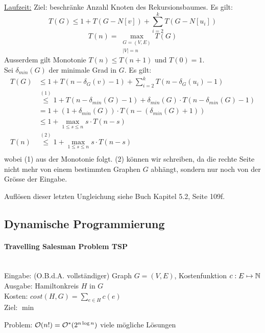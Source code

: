 \underline{Laufzeit:}
Ziel: beschränke Anzahl Knoten des Rekursionsbaumes. Es gilt:
$$ T(G) \leq 1 + T(G-N[v]) + \sum_{i=2}^k T(G-N[u_i]) $$
$$ T(n) = \max_{\substack{ G=(V,E) \\ |V|=n}} T(G) $$
%
Ausserdem gilt Monotonie $T(n) \leq T(n+1)$ und $T(0) = 1$. \\
Sei $\delta_{min}(G)$ der minimale Grad in $G$. Es gilt:
%
\begin{align*}
T(G) & \leq 1 + T(n - \delta_G(v) - 1) + \sum_{i=2}^k T(n - \delta_G(u_i) - 1) \\
     & \overset{(1)}{\leq} 1 + T(n - \delta_{min}(G) - 1) + \delta_{min}(G) \cdot T(n - \delta_{min}(G) - 1) \\
     & = 1 + (1 + \delta_{min}(G)) \cdot T(n - (\delta_{min}(G) + 1)) \\
     & \leq 1 + \max_{1 \leq s \leq n} s \cdot T(n - s) \\
T(n) & \overset{(2)}{\leq} 1 + \max_{1 \leq s \leq n} s \cdot T(n - s) \\
\end{align*}
wobei (1) aus der Monotonie folgt.
(2) können wir schreiben, da die rechte Seite nicht mehr von einem bestimmten Graphen $G$ abhängt,
sondern nur noch von der Grösse der Eingabe.

Auflösen dieser letzten Ungleichung siehe Buch Kapitel 5.2, Seite 109f.


\subsection{Dynamische Programmierung}

\paragraph{Travelling Salesman Problem TSP} \mbox{} \\
Eingabe: (O.B.d.A. vollständiger) Graph $G=(V,E)$, Kostenfunktion $c : E \mapsto \mathbb{N}$ \\
Ausgabe: Hamiltonkreis $H$ in $G$ \\
Kosten: $cost(H, G) = \sum_{e \in H} c(e) $ \\
Ziel: $\min$

Problem: $\mathcal{O}(n!) = \mathcal{O}^* (2^{n \log n})$ viele mögliche Lösungen


